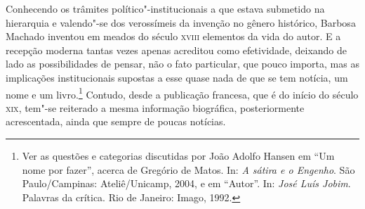 Conhecendo os trâmites político"-institucionais a que estava submetido na
hierarquia e valendo"-se dos verossímeis da invenção no gênero
histórico, Barbosa Machado inventou em meados do século 	\textsc{xviii} elementos
da vida do autor. E a recepção moderna tantas vezes apenas acreditou
como efetividade, deixando de lado as possibilidades de pensar, não o
fato particular, que pouco importa, mas as implicações institucionais
supostas a esse quase nada de que se tem notícia, um nome e um
livro.\footnote{ Ver as questões e categorias discutidas por João Adolfo
Hansen em ``Um nome por fazer'', acerca de Gregório de Matos. In: \textit{A sátira e o Engenho}. 
São Paulo/Campinas: Ateliê/Unicamp, 2004, e em “Autor”. In: \textit{José Luís Jobim}. Palavras da
crítica. Rio de Janeiro: Imago, 1992.} Contudo, desde a publicação
francesa, que é do início do século \textsc{xix}, tem"-se reiterado a mesma
informação biográfica, posteriormente acrescentada, ainda que sempre de
poucas notícias.

